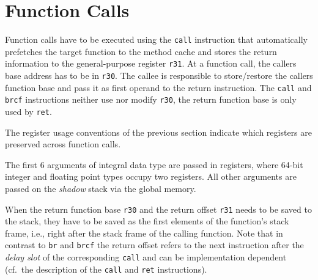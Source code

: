 \section{Function Calls}
\label{sec:function_calls}

Function calls have to be executed using the \texttt{call}
instruction that automatically prefetches the target function to the method
cache and stores the return information to the general-purpose register \texttt{r31}.
At a function call, the callers base address has to be in \texttt{r30}.
The callee is responsible to store/restore the callers function base and pass it as first
operand to the return instruction.
The \texttt{call} and \texttt{brcf} instructions neither use nor modify \texttt{r30}, the
return function base is only used by \texttt{ret}.

The register usage conventions of the previous section indicate which registers
are preserved across function calls.

The first $6$ arguments of integral data type are passed in registers, where
64-bit integer and floating point types occupy two registers. All other
arguments are passed on the \emph{shadow} stack via the global memory.



When the return function base \texttt{r30} and the return offset \texttt{r31}
needs to be saved to the stack, they have to be saved as the first elements
of the function's stack frame, i.e., right after the stack frame of the
calling function. Note that in contrast to \texttt{br} and \texttt{brcf} the
return offset refers to the next instruction after the \emph{delay slot} of the
corresponding \texttt{call} and can be implementation dependent (cf.\ the description
of the \texttt{call} and \texttt{ret} instructions).

